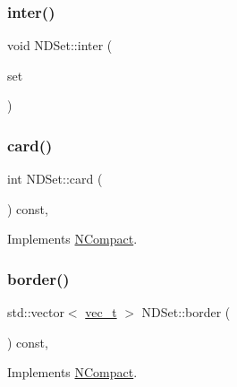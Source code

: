 \mbox{\label{class_n_d_set_abf13bbb9169af9e4b507fc8fcfb83232}} 
\subsubsection{\texorpdfstring{inter()}{inter()}}
{\footnotesize\ttfamily void N\+D\+Set\+::inter (\begin{DoxyParamCaption}\item[{const \mbox{\hyperlink{class_n_d_set}{N\+D\+Set}} \&}]{set }\end{DoxyParamCaption})}

\mbox{\label{class_n_d_set_a683386499ad6a9de65e0197f2846d8de}} 
\subsubsection{\texorpdfstring{card()}{card()}}
{\footnotesize\ttfamily int N\+D\+Set\+::card (\begin{DoxyParamCaption}{ }\end{DoxyParamCaption}) const\hspace{0.3cm}{\ttfamily [override]}, {\ttfamily [virtual]}}



Implements \mbox{\hyperlink{class_n_compact_a816bb4976567a7bfed57763ce717b685}{N\+Compact}}.

\mbox{\label{class_n_d_set_a3020476b78835439f6474845d30f00ff}} 
\subsubsection{\texorpdfstring{border()}{border()}}
{\footnotesize\ttfamily std\+::vector$<$ \mbox{\hyperlink{group___n_algebra_ga0a2cfc67e738a3d73e4f12098c4c07f6}{vec\+\_\+t}} $>$ N\+D\+Set\+::border (\begin{DoxyParamCaption}{ }\end{DoxyParamCaption}) const\hspace{0.3cm}{\ttfamily [override]}, {\ttfamily [virtual]}}



Implements \mbox{\hyperlink{class_n_compact_af7acc50099e80fc13ce32c97e6857308}{N\+Compact}}.

